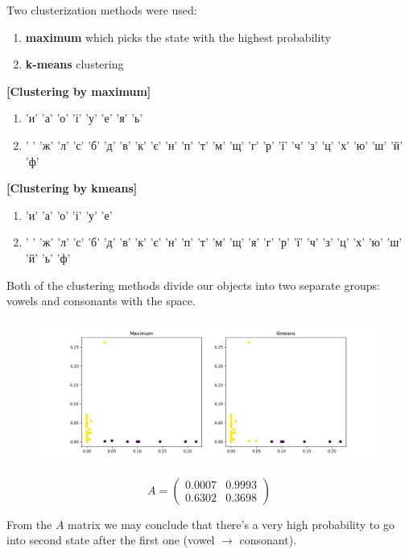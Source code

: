 \documentclass[12pt,a4paper]{article}
\begin{document}
  Two clusterization methods were used:
  \begin{enumerate}
    \item \textbf{maximum} which picks the state with the highest probability
    \item \textbf{k-means} clustering
  \end{enumerate}

  \textbf{[Clustering by maximum]}
  \begin{enumerate}
    \item 'и' 'а' 'о' 'і' 'у' 'е' 'я' 'ь'
    \item ' ' 'ж' 'л' 'с' 'б' 'д' 'в' 'к' 'є' 'н' 'п' 'т' 'м' 'щ' 'г' 'р' 'ї' 'ч' 'з' 'ц' 'х' 'ю' 'ш' 'й' 'ф'
  \end{enumerate}

  \textbf{[Clustering by kmeans]}
  \begin{enumerate}
    \item 'и' 'а' 'о' 'і' 'у' 'е'
    \item ' ' 'ж' 'л' 'с' 'б' 'д' 'в' 'к' 'є' 'н' 'п' 'т' 'м' 'щ' 'я' 'г' 'р' 'ї' 'ч' 'з' 'ц' 'х' 'ю' 'ш' 'й' 'ь' 'ф'
  \end{enumerate}

  Both of the clustering methods divide our objects into two separate groups: vowels and consonants with the space. 

  \begin{figure}[h]
    \includegraphics[width=\textwidth]{../plots/marko-bratu-clustering-1670776439.526882.png}
  \centering
  \end{figure}

  \[ A = \begin{pmatrix} 0.0007 & 0.9993 \\ 0.6302 & 0.3698 \end{pmatrix}  \] 

  From the $A$ matrix we may conclude that there's a very high probability to go into second
  state after the first one (vowel $\to$ consonant).
\end{document}
